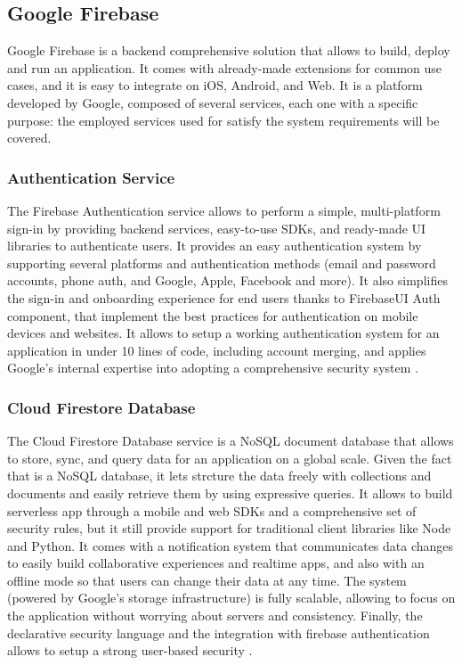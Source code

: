 \subsection{Google Firebase}
Google Firebase is a backend comprehensive solution that allows to build, deploy and run an application. It comes with already-made extensions for common use cases, and it is easy to integrate on iOS, Android, and Web. It is a platform developed by Google, composed of several services, each one with a specific purpose: the employed services used for satisfy the system requirements will be covered.
\subsubsection{Authentication Service}
\label{subsubsec:authenticationService}
The Firebase Authentication service allows to perform a simple, multi-platform sign-in by providing backend services, easy-to-use SDKs, and ready-made UI libraries to authenticate users. It provides an easy authentication system by supporting several platforms and authentication methods (email and password accounts, phone auth, and Google, Apple, Facebook and more). It also simplifies the sign-in and onboarding experience for end users thanks to FirebaseUI Auth component, that implement the best practices for authentication on mobile devices and websites. It allows to setup a working authentication system for an application in under 10 lines of code, including account merging, and applies Google's internal expertise into adopting a comprehensive security system \cite{FirebaseAuthentication}.
\subsubsection{Cloud Firestore Database}
The Cloud Firestore Database service is a NoSQL document database that allows to store, sync, and query data for an application on a global scale. Given the fact that is a NoSQL database, it lets strcture the data freely with collections and documents and easily retrieve them by using expressive queries. It allows to build serverless app through a mobile and web SDKs and a comprehensive set of security rules, but it still provide support for traditional client libraries like Node and Python. It comes with a notification system that communicates data changes to easily build collaborative experiences and realtime apps, and also with an offline mode so that users can change their data at any time. The system (powered by Google's storage infrastructure) is fully scalable, allowing to focus on the application without worrying about servers and consistency. Finally, the declarative security language and the integration with firebase authentication allows to setup a strong user-based security \cite{CloudFirestore}.
